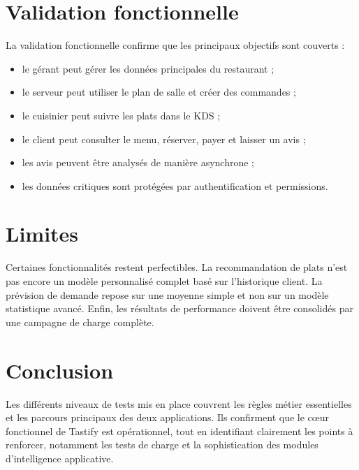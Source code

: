 \section{Validation fonctionnelle}
La validation fonctionnelle confirme que les principaux objectifs sont couverts :

\begin{itemize}[leftmargin=1.2cm]
  \item le gérant peut gérer les données principales du restaurant ;
  \item le serveur peut utiliser le plan de salle et créer des commandes ;
  \item le cuisinier peut suivre les plats dans le KDS ;
  \item le client peut consulter le menu, réserver, payer et laisser un avis ;
  \item les avis peuvent être analysés de manière asynchrone ;
  \item les données critiques sont protégées par authentification et permissions.
\end{itemize}

\section{Limites}
Certaines fonctionnalités restent perfectibles. La recommandation de plats n'est pas encore un modèle personnalisé complet basé sur l'historique client. La prévision de demande repose sur une moyenne simple et non sur un modèle statistique avancé. Enfin, les résultats de performance doivent être consolidés par une campagne de charge complète.

\section*{Conclusion}
Les différents niveaux de tests mis en place couvrent les règles métier essentielles et les parcours principaux des deux applications. Ils confirment que le cœur fonctionnel de Tastify est opérationnel, tout en identifiant clairement les points à renforcer, notamment les tests de charge et la sophistication des modules d'intelligence applicative.
